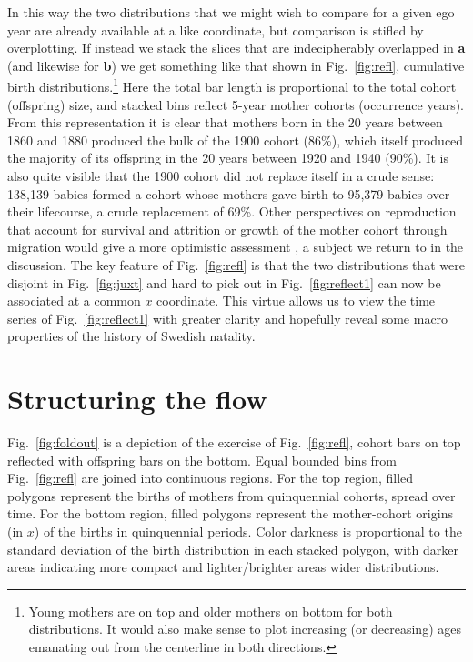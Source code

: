 \documentclass{article}
\begin{document}
In this way the two distributions that we might wish to compare for a given ego year are already available at a like coordinate, but comparison is stifled by overplotting. If instead we stack the slices that are indecipherably overlapped in \textbf{a} (and likewise for \textbf{b}) we get something like that shown in Fig.~\ref{fig:refl}, cumulative birth distributions.\footnote{Young mothers are on top and older mothers on bottom for both distributions. It would also make sense to plot increasing (or decreasing) ages emanating out from the centerline in both directions.} Here the total bar length is proportional to the total cohort (offspring) size, and stacked bins reflect 5-year mother cohorts (occurrence years). From this representation it is clear that mothers born in the 20 years between 1860 and 1880 produced the bulk of the 1900 cohort (86\%), which itself produced the majority of its offspring in the 20 years between 1920 and 1940 (90\%). It is also quite visible that the 1900 cohort did not replace itself in a crude sense: 138,139 babies formed a cohort whose mothers gave birth to 95,379 babies over their lifecourse, a crude replacement of 69\%. Other perspectives on reproduction that account for survival and attrition or growth of the mother cohort through migration would give a more optimistic assessment \citep{henry1965reflexions}, a subject we return to in the discussion. The key feature of Fig.~\ref{fig:refl} is that the two distributions that were disjoint in Fig.~\ref{fig:juxt} and hard to pick out in Fig.~\ref{fig:reflect1} can now be associated at a common $x$ coordinate. This virtue allows us to view the time series of Fig.~\ref{fig:reflect1} with greater clarity and hopefully reveal some macro properties of the history of Swedish natality.

\section{Structuring the flow}
Fig.~\ref{fig:foldout} is a depiction of the exercise of Fig.~\ref{fig:refl}, cohort bars on top reflected with offspring bars on the bottom. Equal bounded bins from Fig.~\ref{fig:refl} are joined into continuous regions. For the top region, filled polygons represent the births of mothers from quinquennial cohorts, spread over time. For the bottom region, filled polygons represent the mother-cohort origins (in $x$) of the births in quinquennial periods. Color darkness is proportional to the standard deviation of the birth distribution in each stacked polygon, with darker areas indicating more compact and lighter/brighter areas wider distributions.
\end{document}
